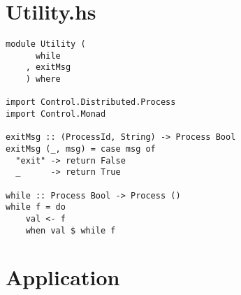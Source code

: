 \documentclass[russian,utf8,simple,emptystyle]{eskdtext}
\begin{document}
\section{Utility.hs}
\begin{lstlisting}
module Utility (
      while
    , exitMsg
    ) where

import Control.Distributed.Process
import Control.Monad 

exitMsg :: (ProcessId, String) -> Process Bool
exitMsg (_, msg) = case msg of
  "exit" -> return False
  _      -> return True

while :: Process Bool -> Process ()
while f = do
    val <- f 
    when val $ while f
\end{lstlisting}

\section{Application}
\end{document}
